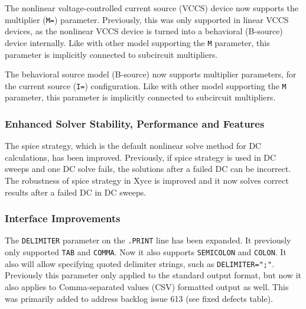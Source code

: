 \documentclass[letterpaper]{scrartcl}
\begin{document}
\begin{XyceItemize}
\item The nonlinear voltage-controlled current source (VCCS) device now supports 
  the multiplier (\texttt{M=}) parameter.  Previously, this was only supported in linear 
  VCCS devices, as the nonlinear VCCS device is turned into a behavioral (B-source) 
  device internally.  Like with other model supporting the \texttt{M} parameter, this 
  parameter is implicitly connected to subcircuit multipliers.

\item The behavioral source model (B-source) now supports multiplier parameters, 
  for the current source (\texttt{I=}) configuration.  Like with other model 
  supporting the \texttt{M} parameter, this parameter is implicitly connected 
  to subcircuit multipliers.

\end{XyceItemize}

\subsubsection*{Enhanced Solver Stability, Performance and Features}
\begin{XyceItemize}


\item The spice strategy, which is the default nonlinear solve method for DC 
calculations, has been improved. Previously, if spice strategy is used in
DC sweeps and one DC solve fails, the solutions after a failed DC can 
be incorrect. The robustness of spice strategy in Xyce is improved and it now
solves correct results after a failed DC in DC sweeps. 

\end{XyceItemize}

\subsubsection*{Interface Improvements}
\begin{XyceItemize}
\item The \texttt{DELIMITER} parameter on the \texttt{.PRINT} line has been expanded.  It previously only supported \texttt{TAB} and \texttt{COMMA}.  Now it also supports \texttt{SEMICOLON} and \texttt{COLON}.  It also will allow specifying quoted delimiter strings, such as \texttt{DELIMITER=";"}.  Previously this parameter only applied to the standard output format, but now it also applies to Comma-separated values (CSV) formatted output as well.  This was primarily added to address backlog issue 613 (see fixed defects table).
\end{XyceItemize}
\end{document}

